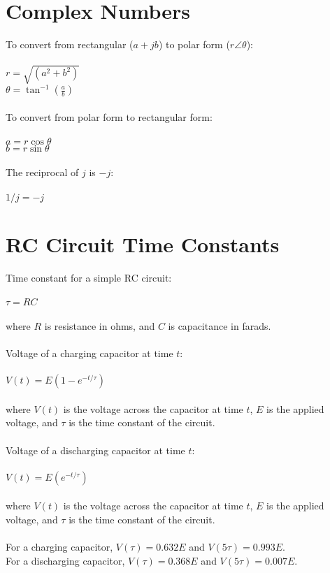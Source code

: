 \documentclass[10pt]{article}
\begin{document}
\section*{Complex Numbers}
To convert from rectangular ($a + jb$) to polar form ($r \angle \theta$):\\\\
$r = \sqrt{(a^2 + b^2)}$\\
$\theta = \tan^{-1}(\frac{a}{b})$\\\\
To convert from polar form to rectangular form:\\\\
$a = r\cos\theta$\\
$b = r\sin\theta$\\\\
The reciprocal of $j$ is $-j$:\\\\
$1/j = -j$
\section*{RC Circuit Time Constants}
Time constant for a simple RC circuit:\\\\
$\tau = RC$\\\\
where $R$ is resistance in ohms, and $C$ is capacitance in farads.\\\\
Voltage of a charging capacitor at time $t$:\\\\
$V(t) = E(1 - e^{-t/\tau})$\\\\
where $V(t)$ is the voltage across the capacitor at time $t$, $E$ is the applied voltage, and $\tau$ is the time constant of the circuit.\\\\
Voltage of a discharging capacitor at time $t$:\\\\
$V(t) = E(e^{-t/\tau})$\\\\
where $V(t)$ is the voltage across the capacitor at time $t$, $E$ is the applied voltage, and $\tau$ is the time constant of the circuit.\\\\
For a charging capacitor, $V(\tau) = 0.632E$ and $V(5\tau) = 0.993E$.\\
For a discharging capacitor, $V(\tau) = 0.368E$ and $V(5\tau) = 0.007E$.
\end{document}
